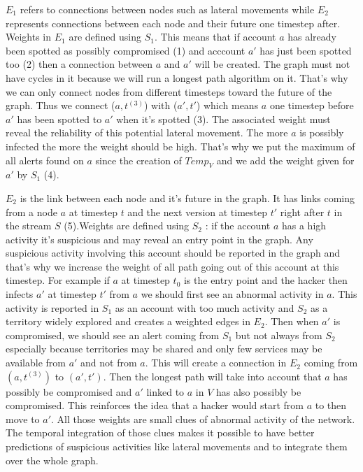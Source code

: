 \documentclass[11pt]{article}
\begin{document}
$E_1$ refers to connections between nodes such as lateral movements while $E_2$ represents connections between each node and their future one timestep after. Weights in $E_1$ are defined using $S_1$. This means that if account $a$ has already been spotted as possibly compromised (1) and acccount $a'$ has just been spotted too (2) then a connection between $a$ and $a'$ will be created. The graph must not have cycles in it because we will run a longest path algorithm on it. That's why we can only connect nodes from different timesteps toward the future of the graph. Thus we connect ($a,t^{(3)}$) with ($a',t'$) which means $a$ one timestep before $a'$ has been spotted to $a'$ when it's spotted (3). The associated weight must reveal the reliability of this potential lateral movement. The more $a$ is possibly infected the more the weight should be high. That's why we put the maximum of all alerts found on $a$ since the creation of $Temp_V$ and we add the weight given for $a'$ by $S_1$ (4).

$E_2$ is the link between each node and it's future in the graph. It has links coming from a node $a$ at timestep $t$ and the next version at timestep $t'$ right after $t$ in the stream $S$ (5).Weights are defined using $S_2$ : if the account $a$ has a high activity it's suspicious and may reveal an entry point in the graph. Any suspicious activity involving this account should be reported in the graph and that's why we increase the weight of all path going out of this account at this timestep. For example if $a$ at timestep $t_0$ is the entry point and the hacker then infects $a'$ at timestep $t'$ from $a$ we should first see an abnormal activity in $a$. This activity is reported in $S_1$ as an account with too much activity and $S_2$ as a territory widely explored and creates a weighted edges in $E_2$. Then when $a'$ is compromised, we should see an alert coming from $S_1$ but not always from $S_2$ especially because territories may be shared and only few services may be available from $a'$ and not from $a$. This will create a connection in $E_2$ coming from $(a,t^{(3)})$ to $(a',t')$. Then the longest path will take into account that $a$ has possibly be compromised and $a'$ linked to $a$ in $V$ has also possibly be compromised. This reinforces the idea that a hacker would start from $a$ to then move to $a'$. All those weights are small clues of abnormal activity of the network. The temporal integration of those clues makes it possible to have better predictions of suspicious activities like lateral movements and to integrate them over the whole graph.
\end{document}
